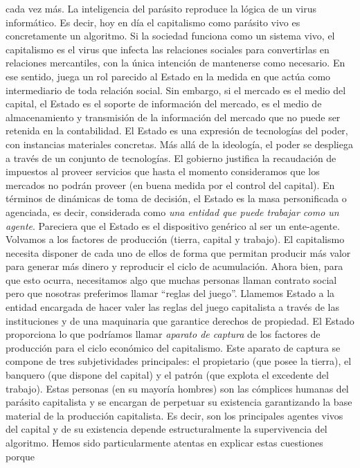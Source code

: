 \documentclass[
]{article}
\begin{document}
cada vez más. La inteligencia del parásito reproduce la lógica de un
virus informático. Es decir, hoy en día el capitalismo como parásito
vivo es concretamente un algoritmo. Si la sociedad funciona como un
sistema vivo, el capitalismo es el virus que infecta las relaciones
sociales para convertirlas en relaciones mercantiles, con la única
intención de mantenerse como necesario. En ese sentido, juega un rol
parecido al Estado en la medida en que actúa como intermediario de toda
relación social. Sin embargo, si el mercado es el medio del capital, el
Estado es el soporte de información del mercado, es el medio de
almacenamiento y transmisión de la información del mercado que no puede
ser retenida en la contabilidad. El Estado es una expresión de
tecnologías del poder, con instancias materiales concretas. Más allá de
la ideología, el poder se despliega a través de un conjunto de
tecnologías. El gobierno justifica la recaudación de impuestos al
proveer servicios que hasta el momento consideramos que los mercados no
podrán proveer (en buena medida por el control del capital). En términos
de dinámicas de toma de decisión, el Estado es la masa personificada o
agenciada, es decir, considerada como \emph{una entidad que puede
trabajar como un agente}. Pareciera que el Estado es el dispositivo
genérico al ser un ente-agente. Volvamos a los factores de producción
(tierra, capital y trabajo). El capitalismo necesita disponer de cada
uno de ellos de forma que permitan producir más valor para generar más
dinero y reproducir el ciclo de acumulación. Ahora bien, para que esto
ocurra, necesitamos algo que muchas personas llaman contrato social pero
que nosotras preferimos llamar ``reglas del juego''. Llamemos Estado a
la entidad encargada de hacer valer las reglas del juego capitalista a
través de las instituciones y de una maquinaria que garantice derechos
de propiedad. El Estado proporciona lo que podríamos llamar
\emph{aparato de captura} de los factores de producción para el ciclo
económico del capitalismo. Este aparato de captura se compone de tres
subjetividades principales: el propietario (que posee la tierra), el
banquero (que dispone del capital) y el patrón (que explota el excedente
del trabajo). Estas personas (en su mayoría hombres) son las cómplices
humanas del parásito capitalista y se encargan de perpetuar su
existencia garantizando la base material de la producción capitalista.
Es decir, son los principales agentes vivos del capital y de su
existencia depende estructuralmente la supervivencia del algoritmo.
Hemos sido particularmente atentas en explicar estas cuestiones porque
\end{document}
